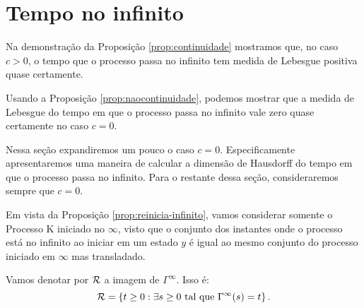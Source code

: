 
\section{Tempo no infinito}
\label{sec:tempo-infinito}

Na demonstração da Proposição \ref{prop:continuidade} mostramos que,
no caso $c > 0$, o tempo que o processo passa no infinito tem medida
de Lebesgue positiva quase certamente.

Usando a Proposição \ref{prop:naocontinuidade}, podemos mostrar que a
medida de Lebesgue do tempo em que o processo passa no infinito vale
zero quase certamente no caso $c = 0$.

Nessa seção expandiremos um pouco o caso $c = 0$. Especificamente
apresentaremos uma maneira de calcular a dimensão de Hausdorff do
tempo em que o processo passa no infinito.  Para o restante dessa
seção, consideraremos sempre que $c = 0$.

Em vista da Proposição \ref{prop:reinicia-infinito}, vamos considerar
somente o Processo K iniciado no $\infty$, visto que o conjunto dos
instantes onde o processo está no infinito ao iniciar em um estado $y$
é igual ao mesmo conjunto do processo iniciado em $\infty$ mas
transladado.

\begin{definicao}
  Vamos denotar por ${\mathcal{R}}$ a imagem de $\Gamma^\infty$. Isso é:
  \begin{displaymath}
    {\mathcal{R}} = \left\{
      t \geq 0 : \exists s \geq 0 \textrm{ tal que } \Gamma^\infty(s) = t
    \right\}.
  \end{displaymath}
\end{definicao}

